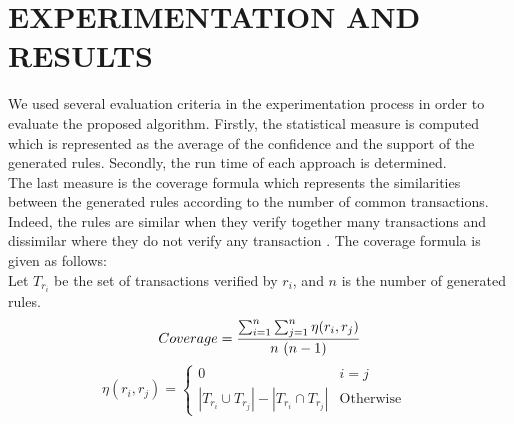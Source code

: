 \documentclass[preprint,12pt]{elsarticle}
\begin{document}
\section{EXPERIMENTATION AND RESULTS}
We used several evaluation criteria in the experimentation process in order to evaluate the proposed algorithm.
Firstly, the statistical measure is computed which is represented as the average of the confidence and the support of the generated rules. 
Secondly, the run time of each approach is determined. \\
The last measure is the coverage formula which represents the similarities 
between the generated rules according to the number of common transactions. Indeed, 
the rules are similar when they verify together many transactions and dissimilar where
they do not verify any transaction \cite{27}. The coverage formula is given as follows:\\
Let $T_{r_i}$ be the set of transactions verified by $r_{i}$, and $n$ is the number of generated rules.\\
\begin{displaymath}
Coverage =   \frac{\sum_{i=1}^{n}{\sum_{j=1}^{n} {\eta{(r_{i},r_{j})}}}}{n~(n-1)} \\
\end{displaymath}
\begin{displaymath}
\eta{(r_{i},r_{j})} =
\left\lbrace
\begin{array}{ccc}
0          &  i = j & \\
\left|T_{r_{i}} \cup T_{r_{j}}\right| - \left|T_{r_{i}} \cap T_{r_{j}}\right|  & \mbox{Otherwise}  
\end{array}\right.
\end{displaymath}
\end{document}
